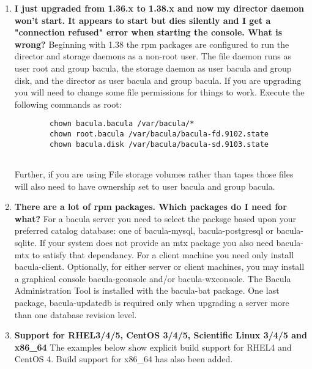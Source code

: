 \begin{enumerate}
\item 
   \label{faq8}
   {\bf I just upgraded from 1.36.x to 1.38.x and now my director daemon
won't start.  It appears to start but dies silently and I get a "connection
refused" error when starting the console.  What is wrong?} Beginning with
1.38 the rpm packages are configured to run the director and storage
daemons as a non-root user.  The file daemon runs as user root and group
bacula, the storage daemon as user bacula and group disk, and the director
as user bacula and group bacula.  If you are upgrading you will need to
change some file permissions for things to work.  Execute the following
commands as root:

\footnotesize
\begin{verbatim}
        chown bacula.bacula /var/bacula/*
        chown root.bacula /var/bacula/bacula-fd.9102.state
        chown bacula.disk /var/bacula/bacula-sd.9103.state
        
\end{verbatim}
\normalsize

Further, if you are using File storage volumes rather than tapes those
files will also need to have ownership set to user bacula and group bacula.

\item 
   \label{faq9}
   {\bf There are a lot of rpm packages.  Which packages do I need for
what?} For a bacula server you need to select the packsge based upon your
preferred catalog database: one of bacula-mysql, bacula-postgresql or
bacula-sqlite.  If your system does not provide an mtx package you also
need bacula-mtx to satisfy that dependancy.  For a client machine you need
only install bacula-client.  Optionally, for either server or client
machines, you may install a graphical console bacula-gconsole and/or
bacula-wxconsole. The Bacula Administration Tool is installed with the 
bacula-bat package.  One last package, bacula-updatedb is required only when
upgrading a server more than one database revision level.



\item {\bf Support for RHEL3/4/5, CentOS 3/4/5, Scientific Linux 3/4/5 and x86\_64}
   The examples below show
   explicit build support for RHEL4 and CentOS 4. Build support 
   for x86\_64 has also been added. 
\end{enumerate}

